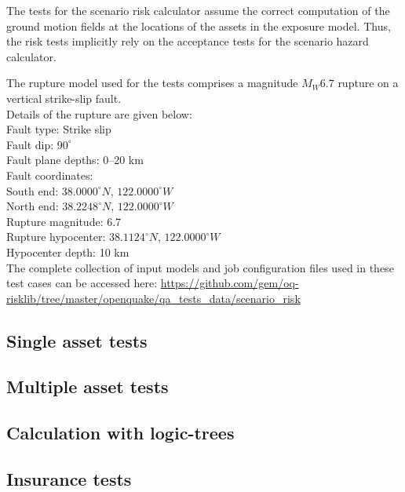The tests for the scenario risk calculator assume the correct computation of the ground motion fields at the locations of the assets in the exposure model. Thus, the risk tests implicitly rely on the acceptance tests for the scenario hazard calculator.

The rupture model used for the tests comprises a magnitude $M_W 6.7$ rupture on a vertical strike-slip fault.\\

\noindent Details of the rupture are given below:\\

\noindent
Fault type: Strike slip\\
Fault dip: $90^{\circ}$\\
Fault plane depths: 0--20 km\\
Fault coordinates:\\
South end: $38.0000^{\circ} N$, $122.0000^{\circ} W$\\
North end: $38.2248^{\circ} N$, $122.0000^{\circ} W$\\
Rupture magnitude: 6.7\\
Rupture hypocenter: $38.1124^{\circ} N$, $122.0000^{\circ} W$\\
Hypocenter depth: 10 km\\

The complete collection of input models and job configuration files used in these test cases can be accessed here:
\href{https://github.com/gem/oq-risklib/tree/master/openquake/qa_tests_data/scenario_risk}
{https://github.com/gem/oq-risklib/tree/master/openquake/qa\_tests\_data/scenario\_risk}

\subsection{Single asset tests}
\label{subsec:acc-scenario-risk-single}


\subsection{Multiple asset tests}
\label{subsec:acc-scenario-risk-multiple}


\subsection{Calculation with logic-trees}
\label{subsec:acc-scenario-risk-logictrees}


\subsection{Insurance tests}
\label{subsec:acc-scenario-risk-insurance}
